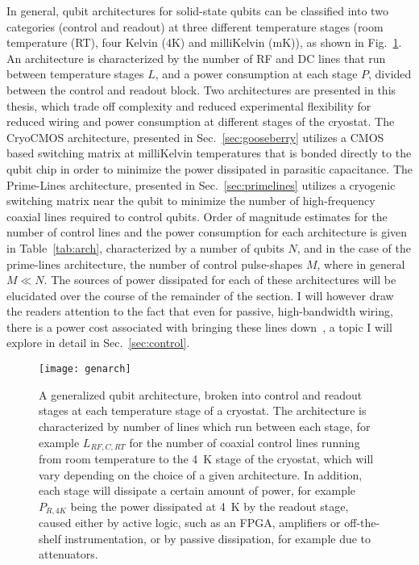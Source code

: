 In general, qubit architectures for solid-state qubits can be classified into two categories (control and readout) at three different temperature stages
(room temperature (RT), four Kelvin (4K) and milliKelvin (mK)), as shown in Fig.~\ref{fig:genarch}. An
architecture is characterized by the number of RF and DC lines that run between temperature stages $L$, and a power consumption at each stage $P$, divided between the control
and readout block. Two architectures are presented in this thesis, which trade off complexity and reduced experimental flexibility for reduced wiring and power consumption
at different stages of the cryostat. The CryoCMOS architecture, presented in Sec.~\ref{sec:gooseberry} utilizes a CMOS based switching matrix at milliKelvin temperatures that is
bonded directly to the qubit chip in order to minimize the power dissipated in parasitic capacitance. The Prime-Lines architecture, presented in Sec.~\ref{sec:primelines}
utilizes a cryogenic switching matrix near the qubit to minimize the number of high-frequency coaxial lines required to control qubits. Order of magnitude estimates
for the number of control lines and the power consumption for each architecture is given in Table~\ref{tab:arch}, characterized by a number of qubits $N$,
and in the case of the prime-lines architecture, the number of control pulse-shapes $M$, where in general $M \ll N$. The sources of power dissipated for each of these architectures
will be elucidated over the course of the remainder of the section. I will however draw the readers attention to the fact that even for passive, high-bandwidth wiring, there is a
power cost associated with bringing these lines down~\cite{Krinner2019}, a topic I will explore in detail in Sec.~\ref{sec:control}.

\begin{figure}
  \texttt{[image: genarch]}
  \caption[Generalized quantum computing architecture]
  {\label{fig:genarch}A generalized qubit architecture, broken into control and readout stages at each temperature stage of a cryostat. The architecture is characterized by number of lines which run between each stage, for example $L_{RF,C,RT}$ for the number of coaxial control lines running from room temperature to the \SI{4}{\kelvin} stage of the cryostat, which will vary depending on the choice of a given architecture. In addition, each stage will dissipate a certain amount of power, for example $P_{R,4K}$ being the power dissipated at \SI{4}{\kelvin} by the readout stage, caused either by active logic, such as an FPGA, amplifiers or off-the-shelf instrumentation, or by passive dissipation, for example due to attenuators.}
\end{figure}

